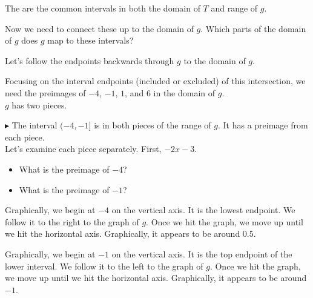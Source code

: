 \documentclass{ximera}
\begin{document}
The are the common intervals in both the domain of $T$ and range of $g$.   

Now we need to connect these up to the domain of $g$.  Which parts of the domain of $g$ does $g$ map to these intervals?

Let's follow the endpoints backwards through $g$ to the domain of $g$.




Focusing on the interval endpoints (included or excluded) of this intersection, we need the preimages of $-4$, $-1$, $1$, and $6$ in the domain of $g$.  \\


$g$ has two pieces. 









$\blacktriangleright$ The interval $(-4, -1]$ is in both pieces of the range of $g$.  It has a preimage from each piece. \\


Let's examine each piece separately.  First, $-2x - 3$. \\


\begin{itemize}
\item What is the preimage of $-4$? 
\item What is the preimage of $-1$? 
\end{itemize}



Graphically, we begin at $-4$ on the vertical axis.  It is the lowest endpoint.  We follow it to the right to the graph of $g$.  Once we hit the graph, we move up until we hit the horizontal axis.  Graphically, it appears to be around $0.5$.


Graphically, we begin at $-1$ on the vertical axis.  It is the top endpoint of the lower interval.  We follow it to the left to the graph of $g$.  Once we hit the graph, we move up until we hit the horizontal axis.  Graphically, it appears to be around $-1$.
\end{document}
